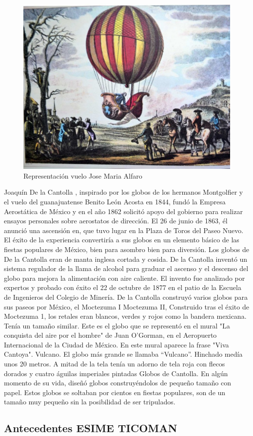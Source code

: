 \documentclass[letterpaper,12pt]{article} %
\begin{document}
\begin{figure}[H]
      \centerline{\includegraphics[width=.4\textwidth]{jma.jpeg}}
      \caption{Representación vuelo Jose Maria Alfaro}
      \label{fig:JMA}
    \end{figure}

Joaquín De la Cantolla , inspirado por los globos de los hermanos Montgolfier y el vuelo del guanajuatense Benito León Acosta en 1844, fundó la Empresa Aerostática de México y en el año 1862 solicitó apoyo del gobierno para realizar ensayos personales sobre aerostatos de dirección.
El 26 de junio de 1863, él anunció una ascensión en, que tuvo lugar en la Plaza de Toros del Paseo Nuevo. 
El éxito de la experiencia convertiría a sus globos en un elemento básico de las fiestas populares de México, bien para asombro bien para diversión. 
Los globos de De la Cantolla eran de manta inglesa cortada y cosida. De la Cantolla inventó un sistema regulador de la llama de alcohol para graduar el ascenso y el descenso del globo para mejora la alimentación con aire caliente. El invento fue analizado por expertos y probado con éxito el 22 de octubre de 1877 en el patio de la Escuela de Ingenieros del Colegio de Minería. 
De la Cantolla construyó varios globos para sus paseos por México, el Moctezuma I
Moctezuma II, Construido tras el éxito de Moctezuma 1, los retales eran blancos, verdes y rojos como la bandera mexicana. Tenía un tamaño similar. Este es el globo que se representó en el mural "La conquista del aire por el hombre" de Juan O'Gorman, en el Aeropuerto Internacional de la Ciudad de México. En este mural aparece la frase "Viva Cantoya".
Vulcano. El globo más grande se llamaba “Vulcano”. Hinchado medía unos 20 metros. A mitad de la tela tenía un adorno de tela roja con flecos dorados y cuatro águilas imperiales pintadas
Globos de Cantolla. En algún momento de su vida, diseñó globos construyéndolos de pequeño tamaño con papel. Estos globos se soltaban por cientos en fiestas populares, son de un tamaño muy pequeño sin la posibilidad de ser tripulados.

\newpage
    \subsection{Antecedentes ESIME TICOMAN}
\end{document}
